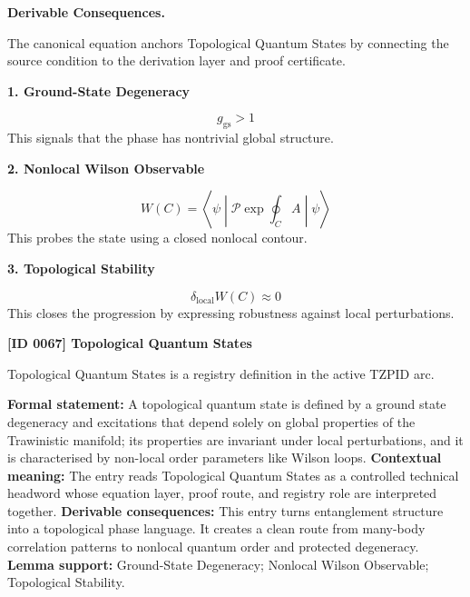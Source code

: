 \par\vspace{0.35em}
\noindent\textbf{Derivable Consequences.}\quad
\begingroup
\footnotesize
\raggedright
The canonical equation anchors Topological Quantum States by connecting the source condition to the derivation layer and proof certificate.
\par\endgroup

\noindent\textbf{1. Ground-State Degeneracy}\par
\[
g_{\mathrm{gs}} > 1
\]
\noindent This signals that the phase has nontrivial global structure.\par
\noindent\textbf{2. Nonlocal Wilson Observable}\par
\[
W(C) = \left\langle \psi \middle| \mathcal{P}\exp\!\oint_{C} A \middle| \psi \right\rangle
\]
\noindent This probes the state using a closed nonlocal contour.\par
\noindent\textbf{3. Topological Stability}\par
\[
\delta_{\mathrm{local}} W(C) \approx 0
\]
\noindent This closes the progression by expressing robustness against local perturbations.\par

\clearpage
\noindent\textbf{[ID 0067] Topological Quantum States}\par
\vspace{0.35em}
\begingroup\small
{}
Topological Quantum States is a registry definition in the active TZPID arc.

\begingroup\footnotesize\setlength{\emergencystretch}{3em}\sloppy
\textbf{Formal statement:} A topological quantum state is defined by a ground state degeneracy and excitations that depend solely on global properties of the Trawinistic manifold; its properties are invariant under local perturbations, and it is characterised by non-local order parameters like Wilson loops. \textbf{Contextual meaning:} The entry reads Topological Quantum States as a controlled technical headword whose equation layer, proof route, and registry role are interpreted together. \textbf{Derivable consequences:} This entry turns entanglement structure into a topological phase language. It creates a clean route from many-body correlation patterns to nonlocal quantum order and protected degeneracy. \textbf{Lemma support:} Ground-State Degeneracy; Nonlocal Wilson Observable; Topological Stability.\par
\endgroup

